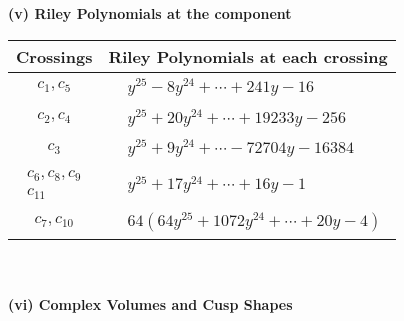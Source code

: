 \documentclass[1p]{elsarticle_modified}
\theoremstyle{definition}
\begin{document}
\newpage\renewcommand{\arraystretch}{1}
\flushleft \textbf{(v) Riley Polynomials at the component}\newline \\
\begin{tabular}{m{50pt}|m{274pt}}
Crossings & \hspace{64pt}Riley Polynomials at each crossing \\
\hline $$\begin{aligned}c_{1},c_{5}\end{aligned}$$&$\begin{aligned}
&y^{25}-8 y^{24}+\cdots+241 y-16
\end{aligned}$\\
\hline $$\begin{aligned}c_{2},c_{4}\end{aligned}$$&$\begin{aligned}
&y^{25}+20 y^{24}+\cdots+19233 y-256
\end{aligned}$\\
\hline $$\begin{aligned}c_{3}\end{aligned}$$&$\begin{aligned}
&y^{25}+9 y^{24}+\cdots-72704 y-16384
\end{aligned}$\\
\hline $$\begin{aligned}c_{6},c_{8},c_{9}\\c_{11}\end{aligned}$$&$\begin{aligned}
&y^{25}+17 y^{24}+\cdots+16 y-1
\end{aligned}$\\
\hline $$\begin{aligned}c_{7},c_{10}\end{aligned}$$&$\begin{aligned}
&64(64 y^{25}+1072 y^{24}+\cdots+20 y-4)
\end{aligned}$\\
\hline
\end{tabular}\\~\\
\newpage\flushleft \textbf{(vi) Complex Volumes and Cusp Shapes}
\end{document}
